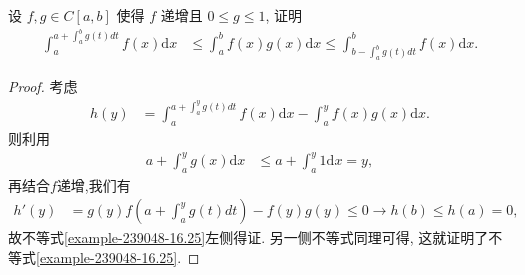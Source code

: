 \documentclass[../../main.tex]{subfiles}
\begin{document}
\begin{example}
设 $f,g \in C[a,b]$ 使得 $f$ 递增且 $0 \leqslant g \leqslant 1$, 证明
\begin{align}\label{example-239048-16.25}
\int_{a}^{a + \int_{a}^{b}g(t)dt}f(x)\mathrm{d}x &\leqslant \int_{a}^{b}f(x)g(x)\mathrm{d}x \leqslant \int_{b - \int_{a}^{b}g(t)dt}^{b}f(x)\mathrm{d}x.
\end{align}
\end{example}
\begin{proof}
考虑
\begin{align*}
h(y) &= \int_{a}^{a + \int_{a}^{y}g(t)dt}f(x)\mathrm{d}x - \int_{a}^{y}f(x)g(x)\mathrm{d}x.
\end{align*}
则利用
\begin{align*}
a + \int_{a}^{y}g(x)\mathrm{d}x &\leqslant a + \int_{a}^{y}1\mathrm{d}x = y,
\end{align*}
再结合$f$递增,我们有
\begin{align*}
h'(y) &= g(y)f\left(a + \int_{a}^{y}g(t)dt\right) - f(y)g(y) \leqslant 0 \to h(b) \leqslant h(a) = 0,
\end{align*}
故不等式\eqref{example-239048-16.25}左侧得证. 另一侧不等式同理可得, 这就证明了不等式\eqref{example-239048-16.25}. 
\end{proof}
\end{document}

